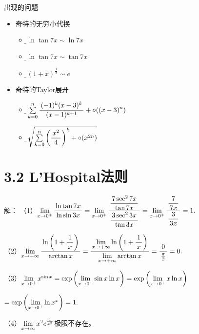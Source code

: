 \begin{frame}{出现的问题}
	\linespread{1.5}
	  \begin{itemize}%
	    \item 奇特的无穷小代换
	    \begin{itemize}
	      \item \it\b $\ln\tan7x\sim\ln7x$
	      \item \it\b $\ln\tan7x\sim\tan7x$
	      \item \it\b $(1+x)^{\frac1x}\sim e$
	    \end{itemize}
	    \item 奇特的Taylor展开
	    \begin{itemize}
	      \item \it \b$\sum\limits_{k=0}^n
	      \displaystyle\frac{\,{(-1)^k(x-3)^k}\,}{\,{(x-1)^{k+1}}\,}+\circ((x-3)^n)$
	      \item \b $\sqrt{\sum\limits_{k=0}^n\left(\displaystyle\frac{\,{x^2}\,}{\,{4}\,}\right)^k
	      +\circ(x^{2n})}$
	    \end{itemize}
	  \end{itemize}
\end{frame}

\section{3.2 L'Hospital法则}

\begin{frame}
	\linespread{1.5}
	\pause
	
	
	\small 解：
	（1）$\lim\limits_{x\to{0^+}}\displaystyle\frac{\,{\ln\tan 7x}\,}{\,{\ln\sin 3x}\,}=\lim\limits_{x\to{0^+}}\displaystyle\frac{\,{\displaystyle\frac{\,{7\sec^27x}\,}{\,{\tan7x}\,}}\,}{\,{\displaystyle\frac{\,{3\sec^23x}\,}{\,{\tan3x}\,}}\,}
	=\lim\limits_{x\to{0^+}}\displaystyle\frac{\,{\displaystyle\frac{\,{7}\,}{\,{7x}\,}}\,}{\,{\displaystyle\frac{\,{3}\,}{\,{3x}\,}}\,}=1.$
	
	\pause	
	（2）$\lim\limits_{x\to{+\infty}}\displaystyle\frac{\,{\ln\left(1+\displaystyle\frac{\,{1}\,}{\,{x}\,}\right)}\,}{\,{\arctan x}\,}
	=\displaystyle\frac{\,{\lim\limits_{x\to{+\infty}}\ln\left(1+\displaystyle\frac{\,{1}\,}{\,{x}\,}\right)}\,}{\,{\lim\limits_{x\to{+\infty}}\arctan
	x}\,}=\displaystyle\frac{\,{0}\,}{\,{\frac{\pi}2}\,}=0.$
	
	
	\pause	
	（3）$\lim\limits_{x\to{0^+}}x^{\sin x}=\exp\left(\lim\limits_{x\to{0^+}}\sin x\ln x\right)
	=\exp\left(\lim\limits_{x\to{0^+}}x\ln x\right)$
	
	\quad$=\exp\left(\lim\limits_{x\to{0^+}}\ln x^x\right)
	=1.$
	
	\pause
	（4）$\lim\limits_{x\to{\infty}}x^2e^{\frac1{x^2}}$极限不存在。

\end{frame}

